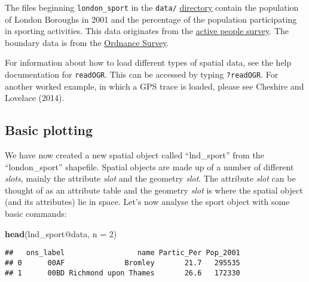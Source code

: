 \documentclass[]{article}
\newenvironment{Shaded}{}{}
\newcommand{\KeywordTok}[1]{\textcolor[rgb]{0.00,0.44,0.13}{\textbf{{#1}}}}
\newcommand{\DataTypeTok}[1]{\textcolor[rgb]{0.56,0.13,0.00}{{#1}}}
\newcommand{\DecValTok}[1]{\textcolor[rgb]{0.25,0.63,0.44}{{#1}}}
\newcommand{\NormalTok}[1]{{#1}}
\begin{document}
The files beginning \texttt{london\_sport} in the \texttt{data/}
\href{https://github.com/Robinlovelace/Creating-maps-in-R/tree/master/data}{directory}
contain the population of London Boroughs in 2001 and the percentage of
the population participating in sporting activities. This data
originates from the
\href{http://data.london.gov.uk/datastore/package/active-people-survey-kpi-data-borough}{active
people survey}. The boundary data is from the
\href{http://www.ordnancesurvey.co.uk/oswebsite/opendata/}{Ordnance
Survey}.

For information about how to load different types of spatial data, see
the help documentation for \texttt{readOGR}. This can be accessed by
typing \texttt{?readOGR}. For another worked example, in which a GPS
trace is loaded, please see Cheshire and Lovelace (2014).

\subsection{Basic plotting}\label{basic-plotting}

We have now created a new spatial object called ``lnd\_sport'' from the
``london\_sport'' shapefile. Spatial objects are made up of a number of
different \emph{slots}, mainly the attribute \emph{slot} and the
geometry \emph{slot}. The attribute \emph{slot} can be thought of as an
attribute table and the geometry \emph{slot} is where the spatial object
(and its attributes) lie in space. Let's now analyse the sport object
with some basic commands:

\begin{Shaded}
\begin{Highlighting}[]
\KeywordTok{head}\NormalTok{(lnd_sport@data, }\DataTypeTok{n =} \DecValTok{2}\NormalTok{)}
\end{Highlighting}
\end{Shaded}

\begin{verbatim}
##   ons_label                 name Partic_Per Pop_2001
## 0      00AF              Bromley       21.7   295535
## 1      00BD Richmond upon Thames       26.6   172330
\end{verbatim}

\begin{Shaded}
\end{Shaded}
\end{document}
